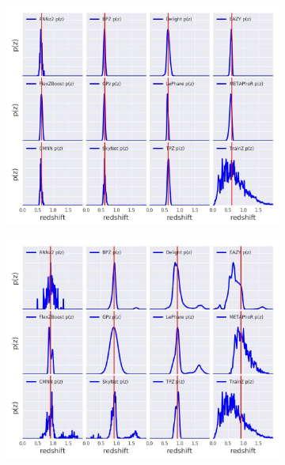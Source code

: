 \documentclass[usenatbib]{mn2e}
\begin{document}
\begin{figure}
\begin{subfigure}[b]{0.49\textwidth}
\includegraphics[width=\textwidth]{figures/pz_12codes_261931_crop.jpg}
\end{subfigure}
\begin{subfigure}[b]{0.49\textwidth}
\includegraphics[width=\textwidth]{figures/pz_12codes_471167_crop.jpg}
\end{subfigure}
\begin{subfigure}[b]{0.49\textwidth}

\end{subfigure}
\end{figure}
\end{document}
